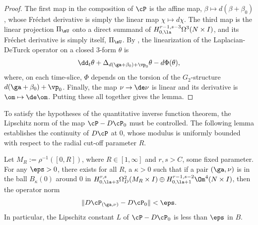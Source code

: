 \documentclass[hidelinks, 12pt, oneside, reqno]{amsart}
\begin{document}
\begin{proof}
    The first map in the composition of $\cP$ is the affine map, $\beta \mapsto d(\beta + \beta_0)$, whose Fr\'echet derivative is simply the linear map $\chi \mapsto d\chi$. The third map is the linear projection $\Pi_{\sU}$ onto a direct summand of $H_{0,\la}^{r-1,s-3}\Omega^3(N \times I)$, and its Fr\'echet derivative is simply itself, $\Pi_{\sU}$. By \cite[Lemma 2.4]{BryantXu}, the linearization of the Laplacian-DeTurck operator on a closed 3-form $\theta$ is
    \[
    \dd_t \theta + \Delta_{d(\ga + \beta_0) + \vp_0} \theta - d\Phi (\theta),
    \]
    where, on each time-slice, $\Phi$ depends on the torsion of the $G_2$-structure $d(\ga + \beta_0) + \vp_0$. Finally, the map $\nu \rightarrow \de \nu$ is linear and its derivative is $\om \mapsto \de \om$. Putting these all together gives the lemma. 
\end{proof}

To satisfy the hypotheses of the quantitative inverse function theorem, the Lipschitz norm of the map $\cP - D\cP_0$ must be controlled. The following lemma establishes the continuity of $D\cP$ at $0$, whose modulus is uniformly bounded with respect to the radial cut-off parameter $R$. 

\begin{lem}\label{lemma lipschitz bounds}
    Let $M_R := \rho^{-1}([0, R])$, where $R \in [1, \infty]$ and $r,s > C$, some fixed parameter. For any $\eps >0$, there exists for all $R$, a $\kappa >0$ such that if a pair $(\ga, \nu)$ is in the ball $B_\kappa(0)$ around $0$ in $H^{r,s}_{0, \la+3} \Omega^2_D (M_R \times I) \oplus H_{0,\la+1}^{r-1,s-2}\Om^4 (N \times I)$, then the operator norm
    \[
    \|D\cP_{(\ga, \nu)} - D\cP_0\| < \eps.
    \]
    In particular, the Lipschitz constant $L$ of $\cP - D\cP_0$ is less than $\eps$ in $B$.
\end{lem}
\end{document}
